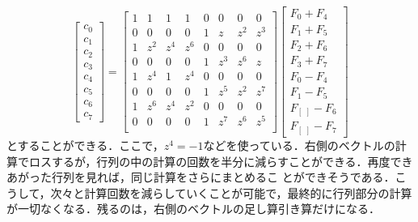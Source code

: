 \begin{equation*}
\left[\begin{array}{c}
c_0\\c_1\\c_2\\c_3\\c_4\\c_5\\c_6\\c_7
\end{array}\right] =
\left[\begin{array}{cccccccc}
1&1&1&1&0&0&0&0\\
0&0&0&0&1&z&z^2&z^3\\
1&z^2&z^4&z^6&0&0&0&0\\
0&0&0&0&1&z^3&z^6&z\\
1&z^4&1&z^4&0&0&0&0\\
0&0&0&0&1&z^5&z^2&z^7\\
1&z^6&z^4&z^2&0&0&0&0\\
0&0&0&0&1&z^7&z^6&z^5\\
\end{array}\right]
\left[\begin{array}{c}
F_0+F_4\\F_1+F_5\\F_2+F_6\\F_3+F_7\\F_0-F_4\\F_1-F_5\\F_{[ \,\,]}-F_6\\F_{[\,\,]}-F_7
\end{array}\right]
\end{equation*}
とすることができる．ここで，$z^4 =-1$などを使っている．右側のベクトルの計算でロスするが，行列の中の計算の回数を半分に減らすことができる．再度できあがった行列を見れば，同じ計算をさらにまとめるこ
とができそうである．こうして，次々と計算回数を減らしていくことが可能で，最終的に行列部分の計算が一切なくなる．残るのは，右側のベクトルの足し算引き算だけになる．

